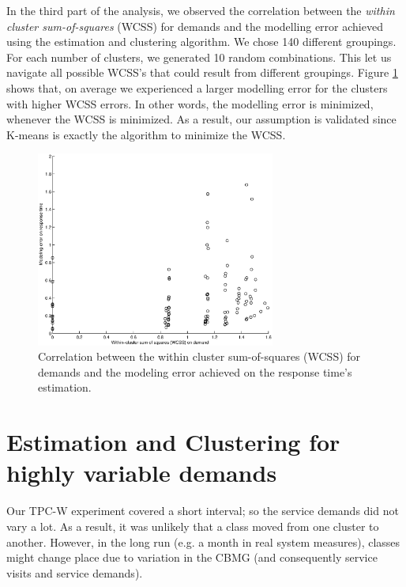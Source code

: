 In the third part of the analysis, we observed the correlation between the \textit{within cluster sum-of-squares} (WCSS) for demands and the modelling error achieved using the estimation and clustering algorithm. We chose 140 different groupings. For each number of clusters, we generated 10 random combinations. This let us navigate all possible WCSS's that could result from different groupings. Figure \ref{fig:cluster-sum-of-squares} shows that, on average we experienced a larger modelling error for the clusters with higher WCSS errors. In other words, the modelling error is minimized, whenever the WCSS is minimized. As a result, our assumption is validated since K-means is exactly the algorithm to minimize the WCSS. 
\begin{figure}[h]
	\centering
	\includegraphics[width=0.7\textwidth]{image/clustering_error_corelation.eps} 
	\caption[The correlation between the within cluster sum-of-squares (WCSS) for demands and the modelling error.]{Correlation between the within cluster sum-of-squares (WCSS) for demands and the modeling error achieved on the response time's estimation.}
	\label{fig:cluster-sum-of-squares}
\end{figure}

\section{Estimation and Clustering for highly variable demands}  
Our TPC-W experiment covered a short interval; so the service demands did not vary a lot. As a result, it was unlikely that a class moved from one cluster to another. However, in the long run (e.g. a month in real system measures), classes might change place due to variation in the CBMG (and consequently service visits and service demands).   

